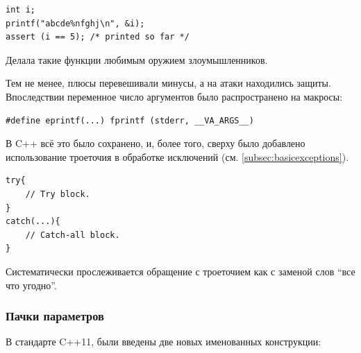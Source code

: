 \documentclass[a4paper,12pt,oneside]{article}
\begin{document}
\begin{lstlisting}
int i;
printf("abcde%nfghj\n", &i);
assert (i == 5); /* printed so far */
\end{lstlisting}

Делала такие функции любимым оружием злоумышленников. 

Тем не менее, плюсы перевешивали минусы, а на атаки находились защиты. Впоследствии переменное число аргументов было распространено на макросы:

\begin{lstlisting}
#define eprintf(...) fprintf (stderr, __VA_ARGS__)
\end{lstlisting}

В C++ всё это было сохранено, и, более того, сверху было добавлено использование троеточия в обработке исключений (см. \ref{subsec:basicexceptions}).

\begin{lstlisting}
try{
    // Try block.
}
catch(...){
    // Catch-all block.
}
\end{lstlisting}

Систематически прослеживается обращение с троеточием как с заменой слов ``все что угодно''.

\subsubsection{Пачки параметров}\label{ParamPack}

В стандарте C++11, были введены две новых именованных конструкции: 
\end{document}
